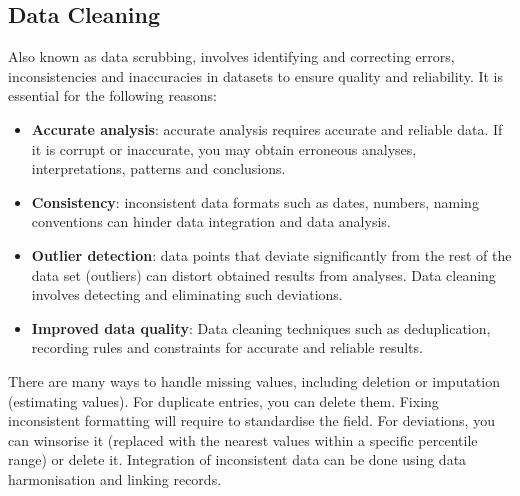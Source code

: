\documentclass[a4paper, 12pt]{article}
\theoremstyle{plain}
\theoremstyle{definition}
\theoremstyle{remark}
\begin{document}
\subsection{Data Cleaning}
Also known as data scrubbing, involves identifying and correcting errors, inconsistencies and inaccuracies in datasets to ensure quality and reliability. It is essential for the following reasons:
\begin{itemize}
	\item \textbf{Accurate analysis}: accurate analysis requires accurate and reliable data. If it is corrupt or inaccurate, you may obtain erroneous analyses, interpretations, patterns and conclusions.
	\item \textbf{Consistency}: inconsistent data formats such as dates, numbers, naming conventions can hinder data integration and data analysis.
	\item \textbf{Outlier detection}: data points that deviate significantly from the rest of the data set (outliers) can distort obtained results from analyses. Data cleaning involves detecting and eliminating such deviations.
	\item \textbf{Improved data quality}: Data cleaning techniques such as deduplication, recording rules and constraints for accurate and reliable results.
\end{itemize}
There are many ways to handle missing values, including deletion or imputation (estimating values). For duplicate entries, you can delete them. Fixing inconsistent formatting will require to standardise the field. For deviations, you can winsorise it (replaced with the nearest values within a specific percentile range) or delete it. Integration of inconsistent data can be done using data harmonisation and linking records. 
\end{document}
